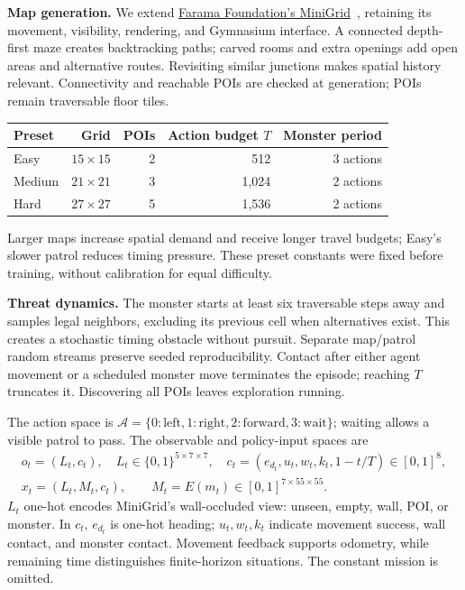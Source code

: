 \documentclass[10pt,a4paper]{article}
\newcommand{\heading}[1]{\vspace{5pt}{\large\bfseries\color{ink}#1}\par\vspace{1pt}}
\newcommand{\subheading}[1]{\textbf{\color{ink}#1}\enspace}
\begin{document}
\subheading{Map generation.} We extend \href{https://github.com/Farama-Foundation/Minigrid}{Farama Foundation's MiniGrid}~\cite{minigrid}, retaining its movement, visibility, rendering, and Gymnasium interface. A connected depth-first maze creates backtracking paths; carved rooms and extra openings add open areas and alternative routes. Revisiting similar junctions makes spatial history relevant. Connectivity and reachable POIs are checked at generation; POIs remain traversable floor tiles.
\begin{center}\small
\begin{tabular}{lrrrr}\toprule
Preset & Grid & POIs & Action budget $T$ & Monster period\\\midrule
Easy & $15\times15$ & 2 & 512 & 3 actions\\
Medium & $21\times21$ & 3 & 1,024 & 2 actions\\
Hard & $27\times27$ & 5 & 1,536 & 2 actions\\\bottomrule
\end{tabular}
\end{center}
Larger maps increase spatial demand and receive longer travel budgets; Easy's slower patrol reduces timing pressure. These preset constants were fixed before training, without calibration for equal difficulty.

\subheading{Threat dynamics.} The monster starts at least six traversable steps away and samples legal neighbors, excluding its previous cell when alternatives exist. This creates a stochastic timing obstacle without pursuit. Separate map/patrol random streams preserve seeded reproducibility. Contact after either agent movement or a scheduled monster move terminates the episode; reaching $T$ truncates it. Discovering all POIs leaves exploration running.

\heading{2\quad Observations, actions, and memory}
The action space is $\mathcal A=\{0:\mathrm{left},1:\mathrm{right},2:\mathrm{forward},3:\mathrm{wait}\}$; waiting allows a visible patrol to pass. The observable and policy-input spaces are
\[
 \begin{gathered}
 o_t=(L_t,c_t),\quad L_t\in\{0,1\}^{5\times7\times7},\quad
 c_t=(e_{d_t},u_t,w_t,k_t,1-t/T)\in[0,1]^8,\\
 x_t=(L_t,M_t,c_t),\qquad M_t=E(m_t)\in[0,1]^{7\times55\times55}.
 \end{gathered}
\]
$L_t$ one-hot encodes MiniGrid's wall-occluded view: unseen, empty, wall, POI, or monster. In $c_t$, $e_{d_t}$ is one-hot heading; $u_t,w_t,k_t$ indicate movement success, wall contact, and monster contact. Movement feedback supports odometry, while remaining time distinguishes finite-horizon situations. The constant mission is omitted.
\end{document}
